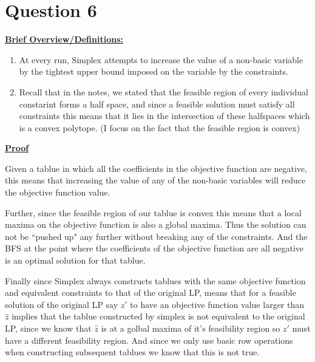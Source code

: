 \documentclass{article}
\numberwithin{equation}{subsection}
\begin{document}
	\newpage 
	\section{Question 6}
		\textbf{\underline{Brief Overview/Definitions:}}
		\begin{enumerate}
			\item At every run, Simplex attempts to increase the value of a non-basic 
					variable by the tightest upper bound imposed on the variable by the constraints. 
			\item Recall that in the notes, we stated that the feasible region of every individual constarint forms a 
				half space, and since a feasible solution must satisfy all constraints this means that it lies in the 
				intersection of these halfspaces which is a convex polytope. (I focus on the fact that the feasible region is convex)
		\end{enumerate}

		\textbf{\underline{Proof}}
		\par{Given a tablue in which all the coefficients in the objective function are negative, this means that increasing the 
				value of any of the non-basic variables will reduce the objective function value.}
		\par{Further, since the feasible region of our tablue is convex this means that a local maxima on the objective function is also a 
		global maxima. Thus the solution can not be ``pushed up" any further without breaking any of the constraints. And the BFS 
		at the point where the coefficients of the objective function are all negative is an optimal solution for that tablue.}
		
		\par{Finally since Simplex always constructs tablues with the same objective function and equivalent constraints to that 
				of the original LP, means that for a feasible solution of the original LP say $z'$ to have an objective function value 
				larger than $\hat{z}$ implies that the tablue constructed by simplex is not equivalent to the original LP, since 
				we know that $\hat{z}$ is at a golbal maxima of it's feasibility region so $z'$ must have a different feasibility region.
				And since we only use basic row operations when constructing subsequent tablues we know that this is not true. }
\end{document}
